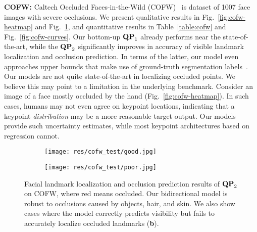 \documentclass[10pt,twocolumn,letterpaper]{article}
\newcommand{\QP}[1]{{${\bf QP}_{#1}$}}
\begin{document}
{\bf COFW:} Caltech Occluded Faces-in-the-Wild
(COFW)~\cite{burgos2013robust} is dataset of 1007 face images with
severe occlusions. We present qualitative results in
Fig.~\ref{fig:cofw-heatmap} and Fig.~\ref{fig:cofw}, and quantitative
results in Table~\ref{table:cofw} and Fig.~\ref{fig:cofw-curves}. Our
bottom-up \QP{1} already performs near the state-of-the-art, while the
\QP{2} significantly improves in accuracy of visible landmark
localization and occlusion prediction. In terms of the latter, our
model even approaches upper bounds that make use of ground-truth
segmentation labels~\cite{ghiasi2015sapm}. Our models are not quite
state-of-the-art in localizing occluded points. We believe this may
point to a limitation in the underlying benchmark.  Consider an image
of a face mostly occluded by the hand
(Fig.~\ref{fig:cofw-heatmap}). In such cases, humans may not even
agree on keypoint locations, indicating that a keypoint {\em
  distribution} may be a more reasonable target output. Our models
provide such uncertainty estimates, while most keypoint architectures
based on regression cannot.

\begin{figure}[t!]
  \centering
  \begin{subfigure}{.75\linewidth}
    \texttt{[image: res/cofw\_test/good.jpg]}
    \caption{}
  \end{subfigure}
  \begin{subfigure}{.1925\linewidth}
    \texttt{[image: res/cofw\_test/poor.jpg]}
    \caption{}
  \end{subfigure}
\caption{Facial landmark localization and occlusion prediction
    results of \QP{2} on COFW, where red means occluded. Our bidirectional
    model is robust to occlusions caused by objects, hair, and
    skin. We also show cases where the model correctly predicts visibility but fails to accurately localize occluded landmarks ({\bf b}).}
  \label{fig:cofw}
\end{figure}
\end{document}
